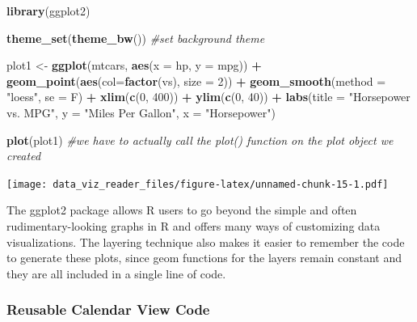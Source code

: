 \documentclass[]{book}
\newenvironment{Shaded}{\begin{snugshade}}{\end{snugshade}}
\newcommand{\CommentTok}[1]{\textcolor[rgb]{0.56,0.35,0.01}{\textit{#1}}}
\newcommand{\DataTypeTok}[1]{\textcolor[rgb]{0.13,0.29,0.53}{#1}}
\newcommand{\DecValTok}[1]{\textcolor[rgb]{0.00,0.00,0.81}{#1}}
\newcommand{\KeywordTok}[1]{\textcolor[rgb]{0.13,0.29,0.53}{\textbf{#1}}}
\newcommand{\NormalTok}[1]{#1}
\newcommand{\OperatorTok}[1]{\textcolor[rgb]{0.81,0.36,0.00}{\textbf{#1}}}
\newcommand{\StringTok}[1]{\textcolor[rgb]{0.31,0.60,0.02}{#1}}
\begin{document}
\begin{Shaded}
\begin{Highlighting}[]
\KeywordTok{library}\NormalTok{(ggplot2)}

\KeywordTok{theme_set}\NormalTok{(}\KeywordTok{theme_bw}\NormalTok{())  }\CommentTok{#set background theme}

\NormalTok{plot1 <-}\StringTok{ }\KeywordTok{ggplot}\NormalTok{(mtcars, }\KeywordTok{aes}\NormalTok{(}\DataTypeTok{x =}\NormalTok{ hp, }\DataTypeTok{y =}\NormalTok{ mpg)) }\OperatorTok{+}\StringTok{ }\KeywordTok{geom_point}\NormalTok{(}\KeywordTok{aes}\NormalTok{(}\DataTypeTok{col=}\KeywordTok{factor}\NormalTok{(vs), }\DataTypeTok{size =} \DecValTok{2}\NormalTok{)) }\OperatorTok{+}\StringTok{ }\KeywordTok{geom_smooth}\NormalTok{(}\DataTypeTok{method =} \StringTok{"loess"}\NormalTok{, }\DataTypeTok{se =}\NormalTok{ F) }\OperatorTok{+}\StringTok{ }\KeywordTok{xlim}\NormalTok{(}\KeywordTok{c}\NormalTok{(}\DecValTok{0}\NormalTok{, }\DecValTok{400}\NormalTok{)) }\OperatorTok{+}\StringTok{ }\KeywordTok{ylim}\NormalTok{(}\KeywordTok{c}\NormalTok{(}\DecValTok{0}\NormalTok{, }\DecValTok{40}\NormalTok{)) }\OperatorTok{+}\StringTok{ }\KeywordTok{labs}\NormalTok{(}\DataTypeTok{title =} \StringTok{"Horsepower vs. MPG"}\NormalTok{, }\DataTypeTok{y =} \StringTok{"Miles Per Gallon"}\NormalTok{, }\DataTypeTok{x =} \StringTok{"Horsepower"}\NormalTok{)}

\KeywordTok{plot}\NormalTok{(plot1)  }\CommentTok{#we have to actually call the plot() function on the plot object we created}
\end{Highlighting}
\end{Shaded}

\texttt{[image: data\_viz\_reader\_files/figure-latex/unnamed-chunk-15-1.pdf]}

The ggplot2 package allows R users to go beyond the simple and often rudimentary-looking graphs in R and offers many ways of customizing data visualizations. The layering technique also makes it easier to remember the code to generate these plots, since geom functions for the layers remain constant and they are all included in a single line of code.

\hypertarget{reusable-calendar-view-code}{%
\subsubsection{Reusable Calendar View Code}\label{reusable-calendar-view-code}}
\end{document}
